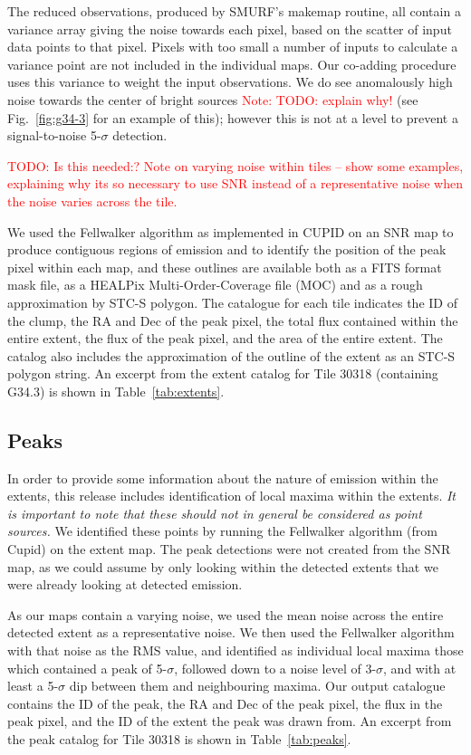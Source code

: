 \documentclass[twocolumn,times]{aastex6}
\newcommand{\todo}[1]{\textcolor{red}{TODO: #1}}
\newcommand{\note}[1]{\textcolor{red}{Note: #1}}
\begin{document}
The reduced observations, produced by SMURF's makemap routine, all
contain a variance array giving the noise towards each pixel, based on
the scatter of input data points to that pixel. Pixels with too small
a number of inputs to calculate a variance point are not included in
the individual maps. Our co-adding procedure uses this variance to
weight the input observations. We do see anomalously high noise
towards the center of bright sources \note{TODO: explain why!} (see
Fig.~\ref{fig:g34-3} for an example of this); however this is not at a
level to prevent a signal-to-noise 5-$\sigma$ detection.

\todo{Is this needed:? Note on varying noise within tiles -- show some examples,
  explaining why its so necessary to use SNR instead of a
  representative noise when the noise varies across the tile.}

We used the Fellwalker algorithm as implemented in CUPID on an SNR map
to produce contiguous regions of emission and to identify the position
of the peak pixel within each map, and these outlines are available
both as a FITS format mask file, as a HEALPix Multi-Order-Coverage
file (MOC) and as a rough approximation by STC-S polygon. The
catalogue for each tile indicates the ID of the clump, the RA and Dec
of the peak pixel, the total flux contained within the entire extent,
the flux of the peak pixel, and the area of the entire extent. The
catalog also includes the approximation of the outline of the extent
as an STC-S polygon string. An excerpt from the extent catalog for
Tile 30318 (containing G34.3) is shown in Table~\ref{tab:extents}.







\subsection{Peaks}
\label{sec:peaks}
In order to provide some information about the nature of emission
within the extents, this release includes identification of local
maxima within the extents. \emph{It is important to note that these
  should not in general be considered as point sources.} We identified
these points by running the Fellwalker algorithm (from Cupid) on the
extent map. The peak detections were not created from the SNR map, as
we could assume by only looking within the detected extents that we
were already looking at detected emission.

As our maps contain a varying noise, we used the mean noise across the
entire detected extent as a representative noise. We then used the
Fellwalker algorithm with that noise as the RMS value, and identified
as individual local maxima those which contained a peak of 5-$\sigma$,
followed down to a noise level of 3-$\sigma$, and with at least a
5-$\sigma$ dip between them and neighbouring maxima. Our output
catalogue contains the ID of the peak, the RA and Dec of the peak
pixel, the flux in the peak pixel, and the ID of the extent the peak
was drawn from. An excerpt from the peak catalog for Tile 30318 is
shown in Table~\ref{tab:peaks}.
\end{document}
